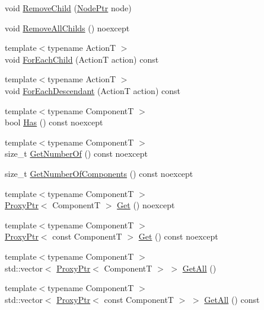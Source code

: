 \begin{DoxyCompactItemize}
\item 
void \hyperlink{classmage_1_1_node_a0654443d58730ebc7471626a38c2bc7f}{Remove\+Child} (\hyperlink{classmage_1_1_node_ac575dc006e0ae1134277ade977dc06b6}{Node\+Ptr} node)
\item 
void \hyperlink{classmage_1_1_node_a601804f7da1df59d5f0bd91a68dc7282}{Remove\+All\+Childs} () noexcept
\item 
{\footnotesize template$<$typename ActionT $>$ }\\void \hyperlink{classmage_1_1_node_a3654fe9e087942fb4d3f0657f4f3e521}{For\+Each\+Child} (ActionT action) const
\item 
{\footnotesize template$<$typename ActionT $>$ }\\void \hyperlink{classmage_1_1_node_a6db4a4bc784a20b833d3fc32a4338318}{For\+Each\+Descendant} (ActionT action) const
\item 
{\footnotesize template$<$typename ComponentT $>$ }\\bool \hyperlink{classmage_1_1_node_a26930d8d190e25afb3910e12167b27b0}{Has} () const noexcept
\item 
{\footnotesize template$<$typename ComponentT $>$ }\\size\+\_\+t \hyperlink{classmage_1_1_node_a0cd486de1639d5af2618ba913124fbe6}{Get\+Number\+Of} () const noexcept
\item 
size\+\_\+t \hyperlink{classmage_1_1_node_a51d74c74f31d8fcbc0cf6768fd180a8e}{Get\+Number\+Of\+Components} () const noexcept
\item 
{\footnotesize template$<$typename ComponentT $>$ }\\\hyperlink{classmage_1_1_proxy_ptr}{Proxy\+Ptr}$<$ ComponentT $>$ \hyperlink{classmage_1_1_node_af514b0282820f1d071fc24a2b815ae82}{Get} () noexcept
\item 
{\footnotesize template$<$typename ComponentT $>$ }\\\hyperlink{classmage_1_1_proxy_ptr}{Proxy\+Ptr}$<$ const ComponentT $>$ \hyperlink{classmage_1_1_node_a597f86bd9faecda719c37c4b2c73231e}{Get} () const noexcept
\item 
{\footnotesize template$<$typename ComponentT $>$ }\\std\+::vector$<$ \hyperlink{classmage_1_1_proxy_ptr}{Proxy\+Ptr}$<$ ComponentT $>$ $>$ \hyperlink{classmage_1_1_node_ade85547b8555c936b2c01873d2c51d2f}{Get\+All} ()
\item 
{\footnotesize template$<$typename ComponentT $>$ }\\std\+::vector$<$ \hyperlink{classmage_1_1_proxy_ptr}{Proxy\+Ptr}$<$ const ComponentT $>$ $>$ \hyperlink{classmage_1_1_node_a6e758fb0114ae432b25d987d44168faa}{Get\+All} () const

\end{DoxyCompactItemize}
